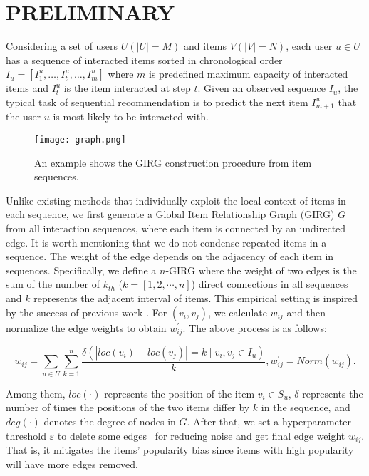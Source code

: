 \documentclass[runningheads]{llncs}
\begin{document}
\section{PRELIMINARY}
\vspace{-10pt}
Considering a set of users $U(|U| = M)$ and items $V(|V| = N)$, each user $u \in U$ has a sequence of interacted items sorted in chronological order $I_{u}=[I_{1}^{u}, \ldots, I_{t}^{u}, \ldots, I_{m}^{u}]$ where $m$ is predefined maximum capacity of interacted items and $I_{t}^{u}$ is the item interacted at step $t$.  Given an observed sequence $I_{u}$, the typical task of sequential recommendation is to predict the next item $I_{m+1}^u$ that the user $u$ is most likely to be interacted with.

\begin{figure}
\centering
\texttt{[image: graph.png]}
\caption{An example shows the GIRG construction procedure from item sequences.} \label{fig1}
\end{figure}

\vspace{-15pt}

Unlike existing methods \cite{gru4rec,SASRec,s3rec,cl4rec} that individually exploit the local context of items in each sequence, we first generate a Global Item Relationship Graph (GIRG) \(G\) from all interaction sequences, where each item is connected by an undirected edge. It is worth mentioning that we do not condense repeated items in a sequence. The weight of the edge depends on the adjacency of each item in sequences. Specifically, we define a \(n\)-GIRG where the weight of two edges is the sum of the number of \(k_{th}\) (\(k=[1,2,\cdots,n]\)) direct connections in all sequences and \(k\) represents the adjacent interval of items. This empirical setting is inspired by the success of previous work \cite{lightgcn}. For \((v_i, v_j)\), we calculate $w_{ij}$ and then normalize the edge weights to obtain ${w}^{\prime}_{ij}$. The above process is as follows:

\vspace{-15pt}
\begin{equation} 
w_{ij}= \sum_{u \in  U} \sum_{k=1}^{n} \frac {\delta(|loc(v_{i})-loc(v_{j})|=k \mid v_{i},v_{j} \in I_u )}{k} , 
w^{\prime}_{ij} = Norm(w_{ij}).
\end{equation}
\vspace{-15pt}

Among them, $loc(\cdot)$ represents the position of the item $v_i \in S_u$,  $\delta$ represents the number of times the positions of the two items differ by $k$ in the sequence, and $deg(\cdot)$ denotes the degree of nodes in $G$. After that, we set a hyperparameter threshold $\varepsilon$ to delete some edges~\cite{srwgnn} for reducing noise and get final edge weight $\hat{w}_{ij}$. That is, it mitigates the items' popularity bias since items with high popularity will have more edges removed.
\end{document}
